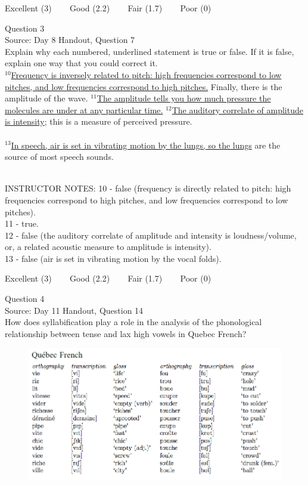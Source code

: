 \documentclass[12pt]{article}
\begin{document}
\vfill
Excellent (3) ~~~ Good (2.2) ~~~ Fair (1.7) ~~~ Poor (0)
\newpage

{\large Question 3}\\

Source: Day 8 Handout, Question 7\\

Explain why each numbered, underlined statement is true or false. If it is false, explain one way that you could correct it.\\

$^{10}$\ul{Frequency is inversely related to pitch: high frequencies correspond to low pitches, and low frequencies correspond to high pitches.} Finally, there is the amplitude of the wave. $^{11}$\ul{The amplitude tells you how much pressure the molecules are under at any particular time.} $^{12}$\ul{The auditory correlate of amplitude is intensity}; this is a measure of perceived pressure.\\\\$^{13}$\ul{In speech, air is set in vibrating motion by the lungs, so the lungs} are the source of most speech sounds.


~\\
INSTRUCTOR NOTES: 10 - false (frequency is directly related to pitch: high frequencies correspond to high pitches, and low frequencies correspond to low pitches).\\11 - true.\\12 - false (the auditory correlate of amplitude and intensity is loudness/volume, or, a related acoustic measure to amplitude is intensity).\\13 - false (air is set in vibrating motion by the vocal folds).


\vfill
Excellent (3) ~~~ Good (2.2) ~~~ Fair (1.7) ~~~ Poor (0)
\newpage

{\large Question 4}\\

Source: Day 11 Handout, Question 14\\

How does syllabification play a role in the analysis of the phonological relationship between tense and lax high vowels in Quebec French?\\

\begin{figure}[H]
\includegraphics{../images/quebecfrench.png}
\end{figure}
\end{document}
